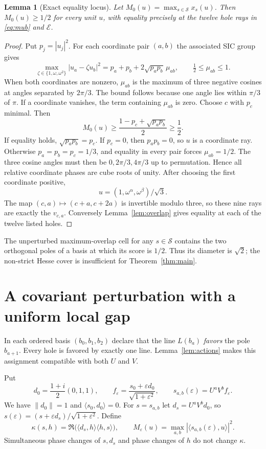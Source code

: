 \documentclass[11pt,a4paper]{article}
\newtheorem{lemma}[theorem]{Lemma}
\theoremstyle{remark}
\numberwithin{equation}{section}
\newcommand{\ip}[2]{\langle #1,#2\rangle}
\newcommand{\norm}[1]{\lVert #1\rVert}
\begin{document}
\begin{lemma}[Exact equality locus]\label{lem:holes}
Let $M_0(u)=\max_{s\in\mathcal S}x_s(u)$. Then $M_0(u)\ge1/2$ for every unit $u$, with equality precisely at the twelve hole rays in \eqref{eq:mub} and $\mathcal E$.
\end{lemma}
\begin{proof}
Put $p_j=|u_j|^2$. For each coordinate pair $(a,b)$ the associated SIC group gives
\[
 \max_{\zeta\in\{1,\omega,\omega^2\}}|u_a-\zeta u_b|^2
 =p_a+p_b+2\sqrt{p_ap_b}\,\mu_{ab},\qquad \tfrac12\le\mu_{ab}\le1.
\]
When both coordinates are nonzero, $\mu_{ab}$ is the maximum of three negative cosines at angles separated by $2\pi/3$. The bound follows because one angle lies within $\pi/3$ of $\pi$. If a coordinate vanishes, the term containing $\mu_{ab}$ is zero. Choose $c$ with $p_c$ minimal. Then
\[
 M_0(u)\ge\frac{1-p_c+\sqrt{p_ap_b}}2\ge\frac12.
\]
If equality holds, $\sqrt{p_ap_b}=p_c$. If $p_c=0$, then $p_ap_b=0$, so $u$ is a coordinate ray. Otherwise $p_a=p_b=p_c=1/3$, and equality in every pair forces $\mu_{ab}=1/2$. The three cosine angles must then be $0,2\pi/3,4\pi/3$ up to permutation. Hence all relative coordinate phases are cube roots of unity. After choosing the first coordinate positive,
\[
 u=(1,\omega^\alpha,\omega^\beta)/\sqrt3.
\]
The map $(c,a)\mapsto(c+a,c+2a)$ is invertible modulo three, so these nine rays are exactly the $v_{c,a}$. Conversely Lemma~\ref{lem:overlap} gives equality at each of the twelve listed holes.
\end{proof}
The unperturbed maximum-overlap cell for any $s\in\mathcal S$ contains the two orthogonal poles of a basis at which its score is $1/2$. Thus its diameter is $\sqrt2$; the non-strict Hesse cover is insufficient for Theorem~\ref{thm:main}.

\section{A covariant perturbation with a uniform local gap}
In each ordered basis $(b_0,b_1,b_2)$ declare that the line $L(b_a)$ \emph{favors} the pole $b_{a+1}$. Every hole is favored by exactly one line. Lemma~\ref{lem:actions} makes this assignment compatible with both $U$ and $V$.

Put
\begin{equation}\label{eq:perturb}
 d_0=\frac{1+i}{2}(0,1,1),\qquad
 f_\varepsilon=\frac{s_0+\varepsilon d_0}{\sqrt{1+\varepsilon^2}},\qquad
 s_{a,b}(\varepsilon)=U^aV^bf_\varepsilon.
\end{equation}
We have $\norm{d_0}=1$ and $\ip{s_0}{d_0}=0$. For $s=s_{a,b}$ let $d_s=U^aV^bd_0$, so $s(\varepsilon)=(s+\varepsilon d_s)/\sqrt{1+\varepsilon^2}$. Define
\[
 \kappa(s,h)=\Re\big(\ip{d_s}h\ip hs\big),\qquad
 M_\varepsilon(u)=\max_{a,b}|\ip{s_{a,b}(\varepsilon)}u|^2.
\]
Simultaneous phase changes of $s,d_s$ and phase changes of $h$ do not change $\kappa$.
\end{document}
